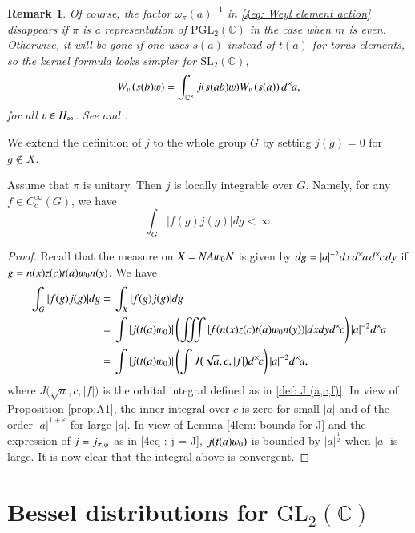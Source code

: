 \documentclass{amsproc}
\newcommand{\BC}{{\mathbb {C}}} \newcommand{\BD}{{\mathbb {D}}}
\newcommand{\GL}{{\mathrm {GL}}} \newcommand{\PGL}{{\mathrm {PGL}}}
\newcommand{\SL}{{\mathrm {SL}}} \newcommand{\PSL}{{\mathrm {PSL}}}
\def\-{^{-1}}
\def\lp {\left (}
\def\rp {\right )}
\def\BCx{\BC^{\times}}
\def\shskip{\hskip 0.5 pt}
\def\dx{d^{\times} \hskip -1 pt}
\theoremstyle{plain}
\newtheorem {rem}[thm]{Remark} \newtheorem {example}[thm]{Example}
\numberwithin{equation}{section}
\begin{document}
	\begin{rem}
		Of course, the factor $ \omega_\pi (  a  )\-$ in \eqref{4eq: Weyl element action} disappears if $\pi $ is a representation of $\PGL_2 (\BC)$ in the case when $m$ is even. Otherwise, it will be gone if one uses $s (a)$ instead of $t (a)$ for torus elements, so the kernel formula  looks simpler for $\SL_2 (\BC)$,
		\begin{equation}%
		W_{\varv} \lp
		s (b)
		\varw  \rp
		=  \int_{\BCx }   j  ( s(ab) \varw ) W_{\varv} \lp
		s (a)
		\rp \dx  a,
		\end{equation}
		for all $\varv \in H_{\infty}$.
		See \cite[Theorem 2]{Mo-Kernel} and \cite[Theorem 2.3]{Baruch-Kernel}.
	\end{rem}
    We extend the definition of $j $ to the whole group $G$ by setting $j (g)=0$ for $g\notin X $.
\begin{prop}\label{thm: local integrability}
		Assume that $\pi $ is unitary. Then $j $ is locally integrable over $G$. Namely, for any $f\in C_c^\infty(G)$, we have
\[
\int_G \left|f(g)j (g) \right| dg<\infty.
\]
	\end{prop}
\begin{proof} Recall that the measure on $X = NA \varw_0 N$ is given by $ d g = |a|^{-2} d x \hskip 1 pt \dx  a   \hskip 1 pt \dx c \hskip 1 pt d y$ if $g = n(x)z(c)t(a)\varw_0n(y)$. We have
\begin{align*}
 \int_G |f(g)j (g)| dg
= \ & \int_{X}|f(g)j (g)|dg \\
= \ &\int |j (t(a)\varw_0)|\left(\iiint |f(n(x)z(c)t(a)\varw_0n(y))|dxdy\dx  c \right) |a|^{-2}\dx  a \\
= \ & \int |j (t(a)\varw_0)| \lp  \int  J \big( \sqrt a,   c, |f| \big)    \dx  c  \rp |a|^{-2} \dx  a,
\end{align*}
where $ J \big( \sqrt a,   c, |f| \big) $ is the orbital integral defined as in \eqref{def: J (a,c,f)}.  In view of Proposition \ref{prop:A1},  the inner integral over $c$ is zero for small $|a|$    and of the order $|a|^{1+\varepsilon}$ for large  $|a|$. In view of  Lemma \ref{4lem: bounds for J} and the expression of $j = j_{\pi, \shskip \psi}$ as in \eqref{4eq : j = J}, $j   (t(a) \varw_0)$ is bounded by $ {|a|}^{\frac 1 2}$ when $|a|$ is large. It is now clear that the integral above is convergent.
\end{proof}
	
	
	
	\section {Bessel distributions for $\GL_2(\BC)$}
	
\end{document}

